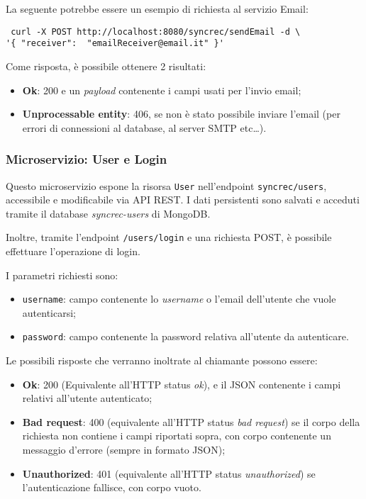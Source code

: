 La seguente potrebbe essere un esempio di richiesta al servizio Email:

\begin{tcolorbox}
	\begin{verbatim} curl -X POST http://localhost:8080/syncrec/sendEmail -d \
'{ "receiver":  "emailReceiver@email.it" }'
	\end{verbatim}
\end{tcolorbox}

Come risposta, è possibile ottenere 2 risultati:
\begin{itemize}
	\item \textbf{Ok}: 200 e un \textit{payload} contenente i campi usati
	per l'invio email;
	\item \textbf{Unprocessable entity}: 406, se non è stato possibile inviare l'email (per errori di connessioni al database, al server SMTP etc\dots).
\end{itemize}

\subsubsection{Microservizio: User e Login}

Questo microservizio espone la risorsa \texttt{User} nell'endpoint
\texttt{syncrec/users}, accessibile e modificabile via API REST. I dati persistenti sono salvati e acceduti tramite il database \textit{syncrec-users} di
MongoDB.

Inoltre, tramite l'endpoint \texttt{/users/login} e una richiesta POST,
è possibile effettuare l'operazione di login.

I parametri richiesti sono:
\begin{itemize}
	\item \texttt{username}: campo contenente lo \textit{username} o l'email dell'utente che vuole autenticarsi;
	\item \texttt{password}: campo contenente la password relativa all'utente da autenticare.
\end{itemize}

Le possibili risposte che verranno inoltrate al chiamante possono essere:
\begin{itemize}
	\item \textbf{Ok}: 200 (Equivalente all'HTTP status \textit{ok}), e il JSON contenente i campi relativi all'utente autenticato;
	\item \textbf{Bad request}: 400 (equivalente all'HTTP status \textit{bad request}) se il corpo della richiesta non contiene i campi riportati sopra, con corpo contenente un messaggio d'errore (sempre in formato JSON);
	\item \textbf{Unauthorized}: 401 (equivalente all'HTTP status \textit{unauthorized}) se l'autenticazione fallisce, con corpo vuoto.
\end{itemize}

